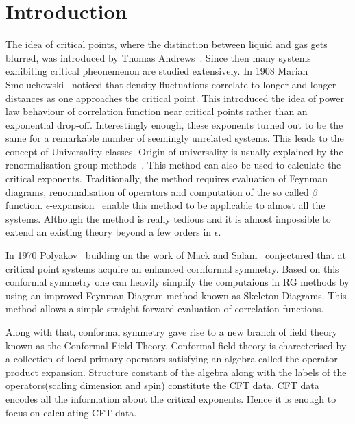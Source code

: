 \documentclass[12pt,a4paper,oneside]{book}
\theoremstyle{definition}
\begin{document}
        \tableofcontents
        \mainmatter
        \chapter{Introduction}
            \hspace{10pt}The idea of critical points, where the distinction between liquid and gas gets blurred, was introduced by Thomas Andrews~\cite{critical}. Since then many systems exhibiting critical pheonemenon are studied extensively. In 1908 Marian Smoluchowski~\cite{longdistance} noticed that density fluctuations correlate to longer and longer distances as one approaches the critical point. This introduced the idea of power law behaviour of correlation function near critical points rather than an exponential drop-off. Interestingly enough, these exponents turned out to be the same for a remarkable number of seemingly unrelated systems. This leads to the concept of Universality classes. Origin of universality is usually explained by the renormalisation group methods~\cite{RG}. This method can also be used to calculate the critical exponents. Traditionally, the method requires evaluation of Feynman diagrams, renormalisation of operators and computation of the so called $\beta$ function. $\epsilon$-expansion~\cite{epsilonexpansion} enable this method to be applicable to almost all the systems. Although the method is really tedious and it is almost impossible to extend an existing theory beyond a few orders in $\epsilon$.  \par
            In 1970 Polyakov~\cite{polyakovsymmetry} building on the work of Mack and Salam~\cite{mack-salam} conjectured that at critical point systems acquire an enhanced cornformal symmetry. Based on this conformal symmetry one can heavily simplify the computaions in RG methods by using an improved Feynman Diagram method known as Skeleton Diagrams. This method allows a simple straight-forward evaluation of correlation functions. \par 
            Along with that, conformal symmetry gave rise  to a new branch of field theory known as  the Conformal Field Theory. Conformal field theory is charecterised by a collection of local primary operators satisfying an algebra called the operator product expansion. Structure constant of the algebra along with the labels of the  operators(scaling dimension and spin) constitute the CFT data. CFT data  encodes all the information about the critical exponents. Hence it is enough to focus on calculating CFT data. \par
\end{document}
